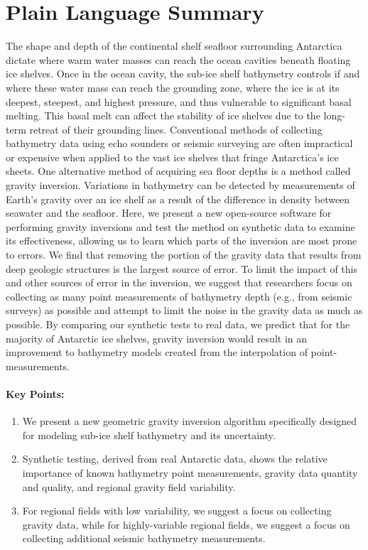 \documentclass[tc, manuscript]{copernicus}
\begin{document}
\section*{Plain Language Summary}
The shape and depth of the continental shelf seafloor surrounding Antarctica dictate where warm water masses can reach the ocean cavities beneath floating ice shelves. Once in the ocean cavity, the sub-ice shelf bathymetry controls if and where these water mass can reach the grounding zone, where the ice is at its deepest, steepest, and highest pressure, and thus vulnerable to significant basal melting. This basal melt can affect the stability of ice shelves due to the long-term retreat of their grounding lines. Conventional methods of collecting bathymetry data using echo sounders or seismic surveying are often impractical or expensive when applied to the vast ice shelves that fringe Antarctica's ice sheets. One alternative method of acquiring sea floor depths is a method called gravity inversion. Variations in bathymetry can be detected by measurements of Earth's gravity over an ice shelf as a result of the difference in density between seawater and the seafloor. Here, we present a new open-source software for performing gravity inversions and test the method on synthetic data to examine its effectiveness, allowing us to learn which parts of the inversion are most prone to errors. We find that removing the portion of the gravity data that results from deep geologic structures is the largest source of error. To limit the impact of this and other sources of error in the inversion, we suggest that researchers focus on collecting as many point measurements of bathymetry depth (e.g., from seismic surveys) as possible and attempt to limit the noise in the gravity data as much as possible. By comparing our synthetic tests to real data, we predict that for the majority of Antarctic ice shelves, gravity inversion would result in an improvement to bathymetry models created from the interpolation of point-measurements.

\paragraph*{Key Points:}
\begin{enumerate}
    \item We present a new geometric gravity inversion algorithm specifically designed for modeling sub-ice shelf bathymetry and its uncertainty.
    \item Synthetic testing, derived from real Antarctic data, shows the relative importance of known bathymetry point measurements, gravity data quantity and quality, and regional gravity field variability.
    \item For regional fields with low variability, we suggest a focus on collecting gravity data, while for highly-variable regional fields, we suggest a focus on collecting additional seismic bathymetry measurements.
\end{enumerate}
\end{document}
